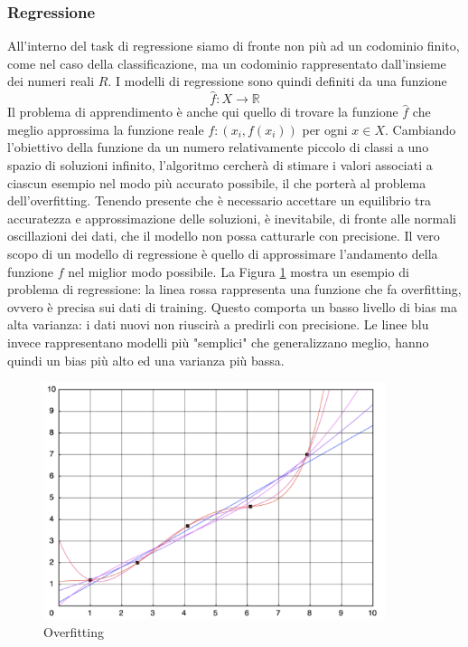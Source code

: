 \subsubsection{Regressione}
All'interno del task di regressione siamo di fronte non più ad un codominio finito, come nel caso della classificazione, ma un codominio rappresentato dall'insieme dei numeri reali \(R\). I modelli di regressione sono quindi definiti da una funzione
\[\hat{f}: X \rightarrow \mathbb{R}\]
Il problema di apprendimento è anche qui quello di trovare la funzione \(\hat{f}\) che meglio approssima la funzione reale \(f: (x_i, f(x_i))\) per ogni \(x\in X\).
Cambiando l'obiettivo della funzione da un numero relativamente piccolo di classi a uno spazio di soluzioni infinito, l'algoritmo cercherà di stimare i valori associati a ciascun esempio nel modo più accurato possibile, il che porterà al problema dell'overfitting. Tenendo presente che è necessario accettare un equilibrio tra accuratezza e approssimazione delle soluzioni, è inevitabile, di fronte alle normali oscillazioni dei dati, che il modello non possa catturarle con precisione. Il vero scopo di un modello di regressione è quello di approssimare l'andamento della funzione $f$ nel miglior modo possibile. La Figura \ref{overfitting} mostra un esempio di problema di regressione: la linea rossa rappresenta una funzione che fa overfitting, ovvero è precisa sui dati di training. Questo comporta un basso livello di bias ma alta varianza: i dati nuovi non riuscirà a predirli con precisione. Le linee blu invece rappresentano modelli più "semplici" che generalizzano meglio, hanno quindi un bias più alto ed una varianza più bassa.

\begin{figure}[t]
	\centering
	\includegraphics[width=10cm, scale=1]{images/overfitting}
	\caption{Overfitting}
	\label{overfitting}
\end{figure}


